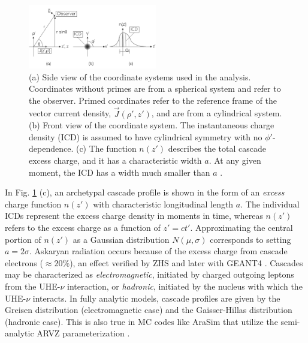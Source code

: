 \documentclass[amsmath,amssymb,aps,prd,10pt,twocolumn]{revtex4}
\begin{document}
\begin{figure}[ht]
\centering
\includegraphics[width=0.5\textwidth]{Geometry.pdf}
\caption{\label{fig:geo} (a) Side view of the coordinate systems used in the analysis. Coordinates without primes are from a spherical system and refer to the observer.  Primed coordinates refer to the reference frame of the vector current density, $\vec{J}(\rho',z')$, and are from a cylindrical system. (b) Front view of the coordinate system.  The instantaneous charge density (ICD) is assumed to have cylindrical symmetry with no $\phi'$-dependence. (c) The function $n(z')$ describes the total cascade excess charge, and it has a characteristic width $a$.  At any given moment, the ICD has a width much smaller than $a$ \cite{10.1016/j.astropartphys.2017.03.008}.}
\end{figure}

In Fig. \ref{fig:geo} (c), an archetypal cascade profile is shown in the form of an \textit{excess} charge function $n(z')$ with characteristic longitudinal length $a$.  The individual ICDs represent the excess charge density in moments in time, whereas $n(z')$ refers to the excess charge as a function of $z' = ct'$.  Approximating the central portion of $n(z')$ as a Gaussian distribution $N(\mu,\sigma)$ corresponds to setting $a = 2 \sigma$. Askaryan radiation occurs because of the excess charge from cascade electrons ($\approx 20\%$), an effect verified by ZHS and later with GEANT4 \cite{zhs,PhysRevD.65.103002,10.1016/j.astropartphys.2017.03.008}.  Cascades may be characterized as \textit{electromagnetic}, initiated by charged outgoing leptons from the UHE-$\nu$ interaction, or \textit{hadronic}, initiated by the nucleus with which the UHE-$\nu$ interacts.  In fully analytic models, cascade profiles are given by the Greisen distribution (electromagnetic case) and the Gaisser-Hillas distribution (hadronic case).  This is also true in MC codes like AraSim that utilize the semi-analytic ARVZ parameterization \cite{10.1016/j.astropartphys.2011.11.010}.
\end{document}
